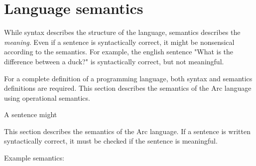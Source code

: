 \section{Language semantics}\label{sec:languagesemantics}
While syntax describes the structure of the language, semantics describes the \textit{meaning}. Even if a sentence is syntactically correct, it might be nonsensical according to the semantics. For example, the english sentence "What is the difference between a duck?" is syntactically correct, but not meaningful.

For a complete definition of a programming language, both syntax and semantics definitions are required. This section describes the semantics of the Arc language using operational semantics.



A sentence might


This section describes the semantics of the Arc language. If a sentence is written syntactically correct, it must be checked if the sentence is meaningful.

Example semantics:

